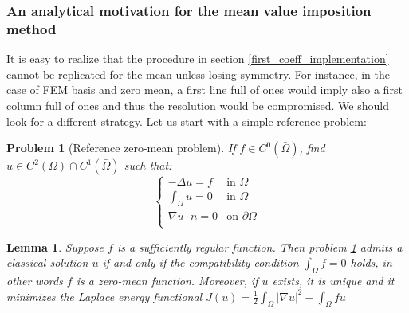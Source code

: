 \documentclass[a4paper,11pt]{article}
\newtheorem{problem}{Problem}
\newtheorem{lemma}{Lemma}
\begin{document}
\subsubsection{An analytical motivation for the mean value imposition method}
\noindent It is easy to realize that the procedure in section \ref{first_coeff_implementation} cannot be replicated for the mean unless losing symmetry. For instance, in the case of FEM basis and zero mean, a first line full of ones would imply also a first column full of ones and thus the resolution would be compromised. We should look for a different strategy. Let us start with a simple reference problem: \\
\begin{problem}[Reference zero-mean problem]  \label{reference_problem} If $f\in C^0(\bar{\Omega})$, find $u\in C^2(\Omega)\cap C^1(\bar{\Omega})$ such that:
\begin{equation*}
\begin{cases}
-\Delta{u}=f & \text{in } \Omega\\
\int_{\Omega} u = 0 & \text{in } \Omega \\
\nabla u \cdot n = 0 & \text{on } \partial \Omega \\
\end{cases}
\end{equation*}
\end{problem}
\vspace{6mm}
\begin{lemma}
	Suppose $f$ is a sufficiently regular function. Then problem \ref{reference_problem} admits a classical solution $u$ if and only if the compatibility condition $\int_{\Omega} f = 0$ holds, in other words $f$ is a zero-mean function. Moreover, if $u$ exists, it is unique and it minimizes the Laplace energy functional $J(u) = \frac{1}{2}\int_{\Omega} |\nabla u |^2 - \int_{\Omega}fu$
\end{lemma} \vspace{3mm}
\end{document}

